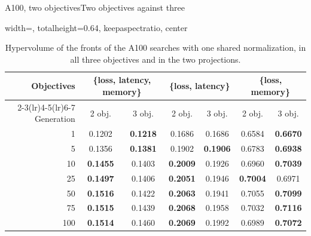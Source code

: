 \documentclass[aspectratio=169,10pt]{beamer}
\begin{document}
\begin{frame}{A100, two objectives}{Two objectives against three}
\begin{table}
\centering
\begin{adjustbox}{width=\linewidth, totalheight=0.64\textheight, keepaspectratio, center}
\centering
\small
\begin{tabular}{rcccccc}
\toprule
Objectives & \multicolumn{2}{c}{\{loss, latency, memory\}} & \multicolumn{2}{c}{\{loss, latency\}} & \multicolumn{2}{c}{\{loss, memory\}} \\
\cmidrule(lr){2-3}\cmidrule(lr){4-5}\cmidrule(lr){6-7}
Generation & 2 obj. & 3 obj. & 2 obj. & 3 obj. & 2 obj. & 3 obj. \\
\midrule
1   & 0.1202          & \textbf{0.1218} & 0.1686          & 0.1686          & 0.6584          & \textbf{0.6670} \\
5   & 0.1356          & \textbf{0.1381} & 0.1902          & \textbf{0.1906} & 0.6783          & \textbf{0.6938} \\
10  & \textbf{0.1455} & 0.1403          & \textbf{0.2009} & 0.1926          & 0.6960          & \textbf{0.7039} \\
25  & \textbf{0.1497} & 0.1406          & \textbf{0.2051} & 0.1946          & \textbf{0.7004} & 0.6971          \\
50  & \textbf{0.1516} & 0.1422          & \textbf{0.2063} & 0.1941          & 0.7055          & \textbf{0.7099} \\
75  & \textbf{0.1515} & 0.1439          & \textbf{0.2068} & 0.1958          & 0.7032          & \textbf{0.7116} \\
100 & \textbf{0.1514} & 0.1460          & \textbf{0.2069} & 0.1992          & 0.6989          & \textbf{0.7072} \\
\bottomrule
\end{tabular}
\end{adjustbox}
\caption{Hypervolume of the fronts of the A100 searches with one shared normalization, in all three
objectives and in the two projections.}\label{tab:a100-hv}
\end{table}
\end{frame}
\end{document}
